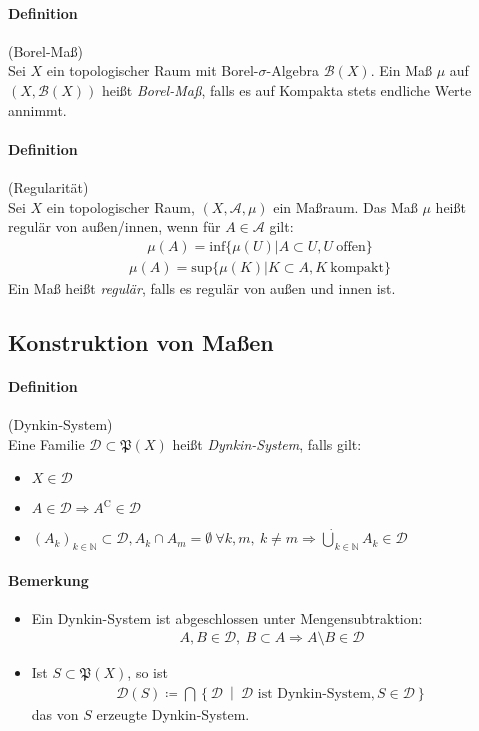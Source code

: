 \documentclass[12pt,a4paper,fleqn]{article}
\def\set#1{{\left\{ #1 \right\}}}
\def\Mid{\ \middle|\ }
\begin{document}
\paragraph{Definition}(Borel-Maß)\\
Sei $X$ ein topologischer Raum mit Borel-$\sigma$-Algebra $\mathcal{B}(X)$. Ein Maß $\mu$ auf $(X, \mathcal{B}(X))$ heißt \textit{Borel-Maß}, falls es auf Kompakta stets endliche Werte annimmt.

\paragraph{Definition}(Regularität)\\
Sei $X$ ein topologischer Raum, $(X, \mathcal{A}, \mu)$ ein Maßraum. Das Maß $\mu$ heißt regulär von außen/innen, wenn für $A \in \mathcal{A}$ gilt:
\begin{align*}
\mu (A) = \text{inf}\{\mu(U) \vert A \subset U, U\ \text{offen}\}
\end{align*}
\begin{align*}
\mu (A) = \text{sup}\{\mu(K) \vert K \subset A, K\ \text{kompakt}\}
\end{align*}
Ein Maß heißt \textit{regulär}, falls es regulär von außen und innen ist.

\subsection{Konstruktion von Maßen}

\paragraph{Definition}(Dynkin-System)\\
Eine Familie $\mathcal{D} \subset \mathfrak{P}(X)$ heißt \textit{Dynkin-System}, falls gilt:
\begin{itemize}
\item$X \in \mathcal{D}$
\item$A \in \mathcal{D} \Rightarrow A^\mathrm{C} \in \mathcal{D}$
\item$(A_k)_{k \in \mathbb{N}} \subset \mathcal{D}, A_k \cap A_m = \emptyset\ \forall k, m,\ k \not = m \Rightarrow \dot\bigcup_{k \in \mathbb{N}} A_k \in \mathcal{D}$
\end{itemize}

\paragraph{Bemerkung}
\begin{itemize}
\item Ein Dynkin-System ist abgeschlossen unter Mengensubtraktion:
\begin{align*}
A, B \in \mathcal{D},\ B \subset A \Rightarrow A \setminus B \in \mathcal{D}
\end{align*}
\item Ist $S \subset \mathfrak{P}(X)$, so ist
\begin{align*}
\mathcal{D}(S) \coloneqq \bigcap \set{\mathcal{D}\Mid \mathcal{D}  \text{ ist Dynkin-System}, S \in \mathcal{D}}
\end{align*}
das von $S$ erzeugte Dynkin-System.
\end{itemize}
\end{document}

